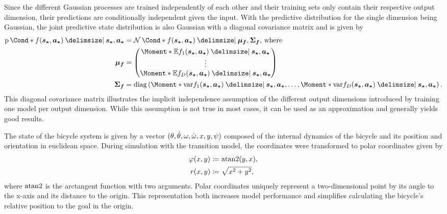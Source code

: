 Since the different Gaussian processes are trained independently of each other and their training sets only contain their respective output dimension, their predictions are conditionally independent given the input.
With the predictive distribution for the single dimension being Gaussian, the joint predictive state distribution is also Gaussian with a diagonal covariance matrix and is given by
\begin{align}
    \Prob*{f(\mat{s_\ast}, \mat{a_\ast}) \given \mat{s_\ast}, \mat{a_\ast}} &=
    \Gaussian*{f(\mat{s_\ast}, \mat{a_\ast}) \given \mat{\mu_f}, \mat{\Sigma_f}}\text{, where} \\
    \mat{\mu_f} &= \begin{pmatrix}
    \Moment*{\E}{f_1(\mat{s_\ast}, \mat{a_\ast}) \given \mat{s_\ast}, \mat{a_\ast}} \\
    \vdots \\
    \Moment*{\E}{f_D(\mat{s_\ast}, \mat{a_\ast}) \given \mat{s_\ast}, \mat{a_\ast}} \\
    \end{pmatrix} \\
    \mat{\Sigma_f} &= \diag\left(
        \Moment*{\var}{f_1(\mat{s_\ast}, \mat{a_\ast}) \given \mat{s_\ast}, \mat{a_\ast}},
        \ldots,
        \Moment*{\var}{f_D(\mat{s_\ast}, \mat{a_\ast}) \given \mat{s_\ast}, \mat{a_\ast}}
    \right).
\end{align}
This diagonal covariance matrix illustrates the implicit independence assumption of the different output dimensions introduced by training one model per output dimension.
While this assumption is not true in most cases, it can be used as an approximation and generally yields good results.

The state of the bicycle system is given by a vector $(\theta, \dot{\theta}, \omega, \dot{\omega}, x, y, \psi)$ composed of the internal dynamics of the bicycle and its position and orientation in euclidean space.
During simulation with the transition model, the coordinates were transformed to polar coordinates given by
\begin{align}
    \varphi(x, y) &\coloneqq \operatorname{atan2}(y, x), \\
    r(x, y) &\coloneqq \sqrt{x^2 + y^2},
\end{align}
where $\operatorname{atan2}$ is the arctangent function with two arguments.
Polar coordinates uniquely represent a two-dimensional point by its angle to the x-axis and its distance to the origin.
This representation both increases model performance and simplifies calculating the bicycle's relative position to the goal in the origin.

